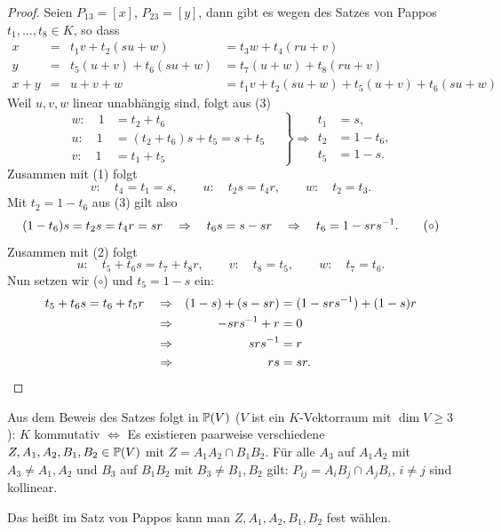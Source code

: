 \documentclass[
 a4paper,
 12pt,
 parskip=half
 ]{scrartcl}
\theoremstyle{plain}
\theoremstyle{definition}
\begin{document}
\begin{proof}
 Seien $P_{13} = [x]$, $P_{23} = [y]$, dann gibt es wegen des Satzes von Pappos $t_1, \ldots, t_8 \in K$, so dass
 \begin{align*}
    x &=   &   t_1 v + t_2 (su+w) &= t_3 w + t_4 (ru+v) \tag{1} \\
    y &=   &   t_5 (u+v) + t_6 (su+w) &= t_7 (u+w) + t_8 (ru+v) \tag{2} \\
  x+y &=   &   u+v+w &= t_1 v + t_2 (su+w) + t_5 (u+v) + t_6 (su+w) \tag{3}
 \end{align*}
 Weil $u,v,w$ linear unabhängig sind, folgt aus (3)
 \[ \left. \begin{aligned}
    w: \quad 1 &= t_2 + t_6 \\
    u: \quad 1 &= (t_2+t_6) s + t_5 = s + t_5 \\
    v: \quad 1 &= t_1 + t_5
    \end{aligned}
    \quad \right\} \Rightarrow 
    \begin{aligned}
     t_1 &= s, \\
     t_2 &= 1 - t_6, \\
     t_5 &= 1 - s. 
    \end{aligned} \]
 Zusammen mit (1) folgt
 \[ v: \quad t_4 = t_1 = s, \qquad u: \quad t_2 s = t_4 r, \qquad w: \quad t_2 = t_3. \]
 Mit $t_2 = 1 - t_6$ aus (3) gilt also
 \[ (1-t_6)s = t_2 s = t_4 r = sr \quad \Rightarrow \quad t_6 s = s - sr \quad \Rightarrow \quad t_6 = 1 - srs^{-1}. \tag{$\circ$} \]
 Zusammen mit (2) folgt
 \[ u: \quad t_5 + t_6s = t_7 + t_8 r, \qquad v: \quad t_8 = t_5, \qquad w: \quad t_7 = t_6. \]
 Nun setzen wir ($\circ$) und $t_5 = 1-s$ ein:
 \begin{align*}
     t_5 + t_6 s = t_6 + t_5 r \quad
     &\Rightarrow & (1-s) + (s-sr) &= (1 - srs^{-1}) + (1-s)r \\
     &\Rightarrow & -srs^{-1} + r &= 0 \\
     &\Rightarrow & srs^{-1} &= r \\
     &\Rightarrow & rs &= sr. \qedhere 
 \end{align*}
\end{proof}

\begin{bem}
 Aus dem Beweis des Satzes folgt in $\mathbb{P}(V)$ ($V$ ist ein $K$-Vektorraum mit $\dim V \ge 3$): $K$ kommutativ $\Leftrightarrow$ Es existieren paarweise verschiedene $Z, A_1, A_2, B_1, B_2 \in \mathbb{P}(V)$ mit $Z = A_1 A_2 \cap B_1 B_2$. Für alle $A_3$ auf $A_1 A_2$ mit $A_3 \ne A_1, A_2$ und $B_3$ auf $B_1 B_2$ mit $B_3 \ne B_1, B_2$ gilt: $P_{ij} = A_i B_j \cap A_j B_i$, $i \ne j$ sind kollinear.
 
 Das heißt im Satz von Pappos kann man $Z, A_1, A_2, B_1, B_2$ fest wählen.
\end{bem}
\end{document}
